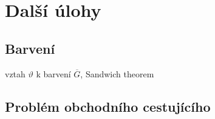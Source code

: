 \chapter{Další úlohy}

\section{Barvení}
vztah $\vartheta$ k barvení $\overline{G}$, Sandwich theorem

\section{Problém obchodního cestujícího}
